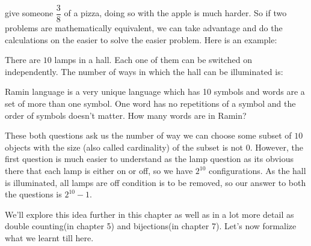 give someone $\dfrac{3}{8}$ of a pizza, doing so with the apple is much harder. So if two problems 
are mathematically equivalent, we can take advantage and do the calculations on the easier to solve
 the easier problem. Here is an example:
\begin{example}
There are $10$ lamps in a hall. Each one of them can be switched on independently.
The number of ways in which the hall can be illuminated is:    
\end{example}
\begin{example}
    Ramin language is a very unique language which has 10 symbols and words are a set of more than one symbol. 
    One word has no repetitions of a symbol and the order of symbols doesn't matter. How many words are in Ramin?
\end{example}
These both questions ask us the number of way we can choose some subset of $10$ objects with the size
(also called cardinality) of the subset is not $0$. However, 
the first question is much easier to understand as the lamp question as 
its obvious there that each lamp is either on or off, so we have $2^{10}$ configurations. 
As the hall is illuminated, all lamps are off condition is to be removed, so our answer to 
both the questions is $2^{10}-1$.\par
We'll explore this idea further in this chapter as well as in a lot more detail as 
double counting(in chapter 5) and bijections(in chapter 7). Let's now formalize what we learnt till here.

